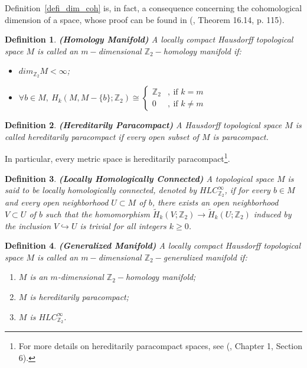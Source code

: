 \documentclass[12pt,oneside]{book}
\newtheorem{defi}   {Definition}[chapter]
\newcommand{\Z}{\mathbb{Z}}
\newcommand{\wt}{\widetilde}
\begin{document}
    Definition~\ref{defi_dim_coh} is, in fact, a consequence concerning the cohomological dimension of a space, whose proof can be found in 
    (\cite{bredon_2}, Theorem 16.14, p. 115).

    \begin{defi}{\bf (Homology Manifold)}
        A locally compact Hausdorff topological space $M$ is called an $m-$dimensional $\Z_{2}-$homology manifold if:
        \begin{itemize}
          \item $dim_{\Z_{2}}M<\infty$;
          \item $\forall b\in M,\ H_{k}(M,M-\{b\};\Z_{2})\cong \left\{ \begin{array}{cl}
            \Z_{2} & ,\ \text{if } k=m \\
            0 & ,\ \text{if } k\neq m
          \end{array}\right.$
        \end{itemize}
    \end{defi}

    \begin{defi}{\bf (Hereditarily Paracompact)}
        A Hausdorff topological space $M$ is called hereditarily paracompact if every open subset of $M$ is paracompact.
    \end{defi}

    In particular, every metric space is hereditarily paracompact\footnote{For more details on hereditarily paracompact spaces, see 
    (\cite{bredon_2}, Chapter 1, Section 6).}.

    \begin{defi}{\bf (Locally Homologically Connected)}
        A topological space $M$ is said to be locally homologically connected, denoted by $HLC_{\Z_{2}}^{\infty}$\index{HLC$_{\Z_{2}}^{\infty}$}, 
        if for every $b\in M$ and every open neighborhood $U\subset M$ of $b$, there exists an open neighborhood $V\subset U$ of $b$ such that the 
        homomorphism $\wt{H}_{k}(V;\Z_{2})\to \wt{H}_{k}(U;\Z_{2})$ induced by the inclusion $V\hookrightarrow U$ is trivial for all integers 
        $k\geq 0$.
    \end{defi}

    \begin{defi}{\bf (Generalized Manifold)}
        A locally compact Hausdorff topological space $M$ is called an $m-$dimensional $\Z_{2}-$generalized manifold if:
        \begin{enumerate}
          \item $M$ is an $m$-dimensional $\Z_{2}-$homology manifold;
          \item $M$ is hereditarily paracompact;
          \item $M$ is $HLC_{\Z_{2}}^{\infty}$.
        \end{enumerate}
    \end{defi}
\end{document}
